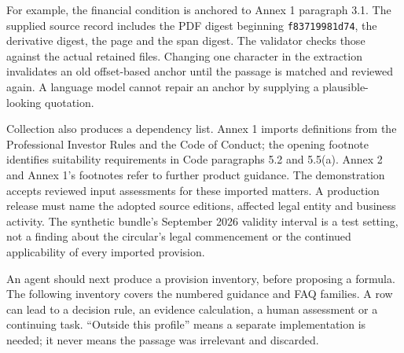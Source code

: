For example, the financial condition is anchored to Annex 1 paragraph 3.1.
The supplied source record includes the PDF digest beginning
\texttt{f83719981d74}, the derivative digest, the page and the span digest.
The validator checks those against the actual retained files. Changing one
character in the extraction invalidates an old offset-based anchor until the
passage is matched and reviewed again. A language model cannot repair an anchor
by supplying a plausible-looking quotation.

Collection also produces a dependency list. Annex 1 imports definitions from the
Professional Investor Rules and the Code of Conduct; the opening footnote
identifies suitability requirements in Code paragraphs 5.2 and 5.5(a). Annex 2
and Annex 1's footnotes refer to further product guidance. The demonstration
accepts reviewed input assessments for these imported matters. A production
release must name the adopted source editions, affected legal entity and
business activity. The synthetic bundle's September 2026 validity interval is
a test setting, not a finding about the circular's legal commencement or the
continued applicability of every imported provision.

An agent should next produce a provision inventory, before proposing a formula.
The following inventory covers the numbered guidance and FAQ families. A row
can lead to a decision rule, an evidence calculation, a human assessment or a
continuing task. ``Outside this profile'' means a separate implementation is
needed; it never means the passage was irrelevant and discarded.

